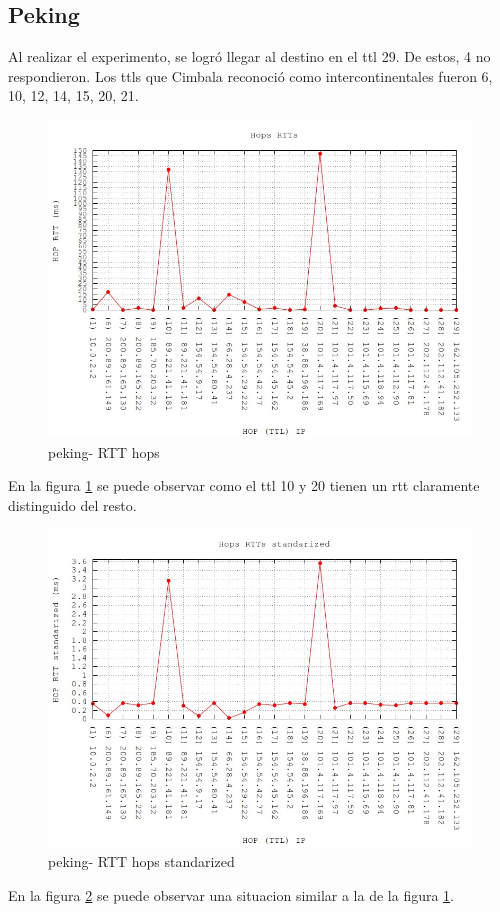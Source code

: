 \subsection{Peking}

Al realizar el experimento, se logró llegar al destino en el ttl 29. De estos, 4 no respondieron. Los ttls que Cimbala reconoció como intercontinentales fueron 6, 10, 12, 14, 15, 20, 21.

\begin{figure}[!htbp]
  \centering
    \includegraphics[scale=0.6]{imagenes/peking-graficos/traceroute-peking.jpg}
  \caption{peking- RTT hops}
  \label{fig:10}
\end{figure}

En la figura \ref{fig:10} se puede observar como el ttl 10 y 20 tienen un rtt claramente distinguido del resto.

\begin{figure}[!htbp]
  \centering
    \includegraphics[scale=0.6]{imagenes/peking-graficos/traceroute-peking-standarized.jpg}
  \caption{peking- RTT hops standarized}
  \label{fig:11}
\end{figure}

En la figura \ref{fig:11} se puede observar una situacion similar a la de la figura \ref{fig:10}.

